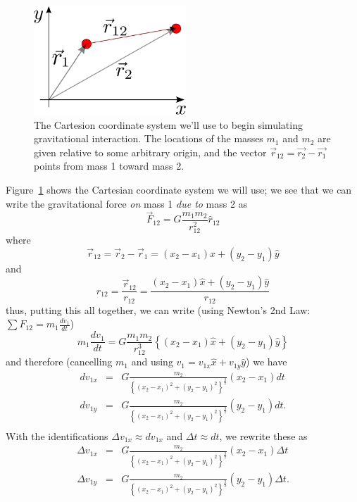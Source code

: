 \begin{figure}[tb]\centering \sidecaption
	\includegraphics[width=2.25in]{Figures/Kinematics/gravityCoordSystem.pdf}
	\caption{The Cartesion coordinate system we'll use to begin simulating gravitational interaction. The locations of the masses $m_1$ and $m_2$ are given relative to some arbitrary origin, and the vector $\vec{r}_{12} = \vec{r_2}- \vec{r_1}$ points from mass 1 toward mass 2.}
	 \label{fig:gravityCoordSystem}
\end{figure}
Figure~\ref{fig:gravityCoordSystem} shows the Cartesian coordinate system we will use;  we see that we can write the gravitational force \textit{on} mass 1 \textit{due to} mass 2 as\\ 
\begin{equation}
	\vec{F}_{12} = G\frac{m_1 m_2}{r_{12}^2} \hat{r}_{12} \label{eq:gravity}
\end{equation}
where
\begin{equation}
	\vec{r}_{12} = \vec{r}_2 - \vec{r}_1 = (x_2 - x_1)\hat{x} + (y_2 - y_1)\hat{y} 	
\end{equation}
and 
\begin{equation}
\hat{r}_{12} = \frac{\vec{r}_{12}}{r_{12}} = \frac{(x_2 - x_1)\hat{x} + (y_2 - y_1)\hat{y}}{r_{12}}	
\end{equation}
thus, putting this all together, we can write (using Newton's 2nd Law: $\sum F_{12} = m_1 \frac{dv_1}{dt} $)
$$  
m_1\frac{dv_1}{dt} =  G\frac{m_1 m_2}{r_{12}^3}\left\{(x_2 - x_1)\hat{x} + (y_2 - y_1)\hat{y}\right\} 	
$$
and therefore (cancelling $m_1$ and using $v_1 = v_{1x} \hat{x} + v_{1y} \hat{y}$) we have
\begin{eqnarray}
	dv_{1x} & = & G\frac{m_2}{\left\{(x_2 - x_1)^2 + (y_2 - y_1)^2\right\}^\frac{3}{2} }(x_2 - x_1) dt\\
	dv_{1y} & = & G\frac{m_2}{\left\{(x_2 - x_1)^2 + (y_2 - y_1)^2\right\}^\frac{3}{2} }(y_2 - y_1) dt.\\
\end{eqnarray}
With the identifications $\Delta v_{1x} \approx dv_{1x}$ and $\Delta t \approx dt$, we rewrite these as 
\begin{eqnarray}
	\Delta v_{1x} & = & G\frac{m_2}{\left\{(x_2 - x_1)^2 + (y_2 - y_1)^2\right\}^\frac{3}{2} }(x_2 - x_1) \Delta t\\
	\Delta v_{1y} & = & G\frac{m_2}{\left\{(x_2 - x_1)^2 + (y_2 - y_1)^2\right\}^\frac{3}{2} }(y_2 - y_1) \Delta t.\\
\end{eqnarray}
